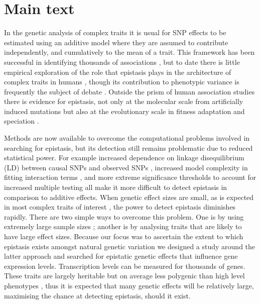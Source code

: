 \documentclass{article}
\begin{document}
\section{Main text}

In the genetic analysis of complex traits it is usual for SNP effects to be estimated using an additive model where they are assumed to contribute independently, and cumulatively to the mean of a trait. This framework has been successful in identifying thousands of associations \cite{Visscher2012}, but to date there is little empirical exploration of the role that epistasis plays in the architecture of complex traits in humans \cite{Strange2010, Evans2011}, though its contribution to phenotypic variance is frequently the subject of debate \cite{Carlborg2004, Hill2008a, Crow2010}. Outside the prism of human association studies there is evidence for epistasis, not only at the molecular scale from artificially induced mutations \cite{Costanzo2010} but also at the evolutionary scale in fitness adaptation \cite{Weinreich2006} and speciation \cite{Breen2012}.

Methods are now available to overcome the computational problems involved in searching for epistasis, but its detection still remains problematic due to reduced statistical power. For example increased dependence on linkage disequilibrium (LD) between causal SNPs and observed SNPs \cite{Weir2008, Hemani2013}, increased model complexity in fitting interaction terms \cite{Marchini2005}, and more extreme significance thresholds to account for increased multiple testing \cite{Cordell2009} all make it more difficult to detect epistasis in comparison to additive effects. When genetic effect sizes are small, as is expected in most complex traits of interest \cite{Visscher2012}, the power to detect epistasis diminishes rapidly. There are two simple ways to overcome this problem. One is by using extremely large sample sizes \cite{LangoAllen2010}; another is by analysing traits that are likely to have large effect sizes. Because our focus was to ascertain the extent to which epistasis exists amongst natural genetic variation we designed a study around the latter approach and searched for epistatic genetic effects that influence gene expression levels. Transcription levels can be measured for thousands of genes. These traits are largely heritable but on average less polygenic than high level phenotypes \cite{Powell2013}, thus it is expected that many genetic effects will be relatively large, maximising the chance at detecting epistasis, should it exist.
\end{document}
